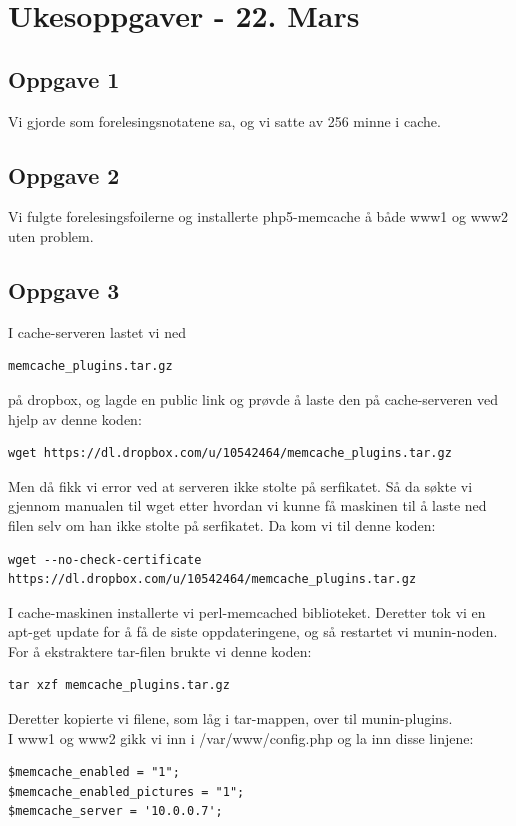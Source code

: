 \documentclass[a4paper, norsk, 12pt]{article}
\begin{document}
\section{Ukesoppgaver - 22. Mars}
\subsection{Oppgave 1}
Vi gjorde som forelesingsnotatene sa, og vi satte av 256 minne i cache.

\subsection{Oppgave 2}
Vi fulgte forelesingsfoilerne og installerte php5-memcache å både www1 og www2 uten problem. 

\subsection{Oppgave 3}
I cache-serveren lastet vi ned \begin{verbatim}memcache_plugins.tar.gz \end{verbatim}på dropbox, og lagde en public link og prøvde å laste den på cache-serveren ved hjelp av denne koden:
\begin{verbatim}
wget https://dl.dropbox.com/u/10542464/memcache_plugins.tar.gz
\end{verbatim}
Men då fikk vi error ved at serveren ikke stolte på serfikatet. Så da søkte vi gjennom manualen til wget etter hvordan vi kunne få maskinen til å laste ned filen selv om han ikke stolte på serfikatet. Da kom vi til denne koden:
\begin{verbatim}
wget --no-check-certificate https://dl.dropbox.com/u/10542464/memcache_plugins.tar.gz
\end{verbatim} 

I cache-maskinen installerte vi perl-memcached biblioteket. Deretter tok vi en apt-get update for å få de siste oppdateringene, og så restartet vi munin-noden.\\

For å ekstraktere tar-filen brukte vi denne koden:

\begin{verbatim}
tar xzf memcache_plugins.tar.gz
\end{verbatim}

Deretter kopierte vi filene, som låg i tar-mappen, over til munin-plugins.\\

I www1 og www2 gikk vi inn i /var/www/config.php og la inn disse linjene: 
\begin{verbatim}
$memcache_enabled = "1";
$memcache_enabled_pictures = "1";
$memcache_server = '10.0.0.7';
\end{verbatim}
\end{document}
